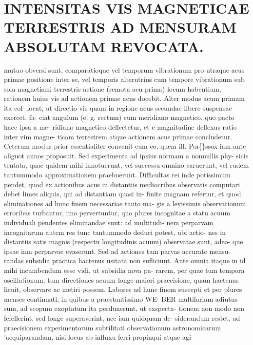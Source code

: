 \documentclass[12pt,a4paper]{article}
\begin{document}
\section*{INTENSITAS VIS MAGNETICAE TERRESTRIS AD MENSURAM ABSOLUTAM REVOCATA.}


mutuo obversi sunt, comparatioque vel temporum vibrationum pro utraque acus
primae positione inter se, vel temporis alterutrius cum tempore vibrationum sub
sola magnetismi terrestris actione (remota acu prima) locum habentium, rationem
huius vis ad actionem primae acus docebit. Alter modus acum primam ita col-
locat, ut directio vis quam in regione acus secundae libere suspensae exercet, fa-
ciat angulum (e. g. rectum) cum meridiano magnetico, quo pacto haec ipsa a me-
ridiano magnetico deflectetur, et e magnitudine deflexus ratio inter vim magne-
ticam terrestrem atque actionem acus primae concludetur.
Ceterum modus prior essentialiter convenit cum eo, quem ill. Po\i\{\}ssox iam
ante aliguot annos proposuit. Sed experimenta ad ipsius normam a nonnullis phy-
sicis tentata, quae quidem mihi innotuerunt,     vel successu omnino caruerunt,     vel
rudem tantummodo approximationem praebuerunt.
Difficultas rei inde potissimum pendet, quod ex actionibus acus in distantiis
mediocribus observatis computari debet limes aliquis, qui ad distantiam quasi in-
finite magnam refertur, et quod eliminationes ad hunc finem necessariae tanto ma-
gis a levissimis observationum erroribus turbantur, imo pervertuntur, quo plures
incognitae a statu acuum individuali pendentes eliminandae sunt: ad multitudi-
nem perparvam incognitarum autem res tunc tantummodo deduci potest, ubi actio-
nes in distantiis satis magnis (respectu longitudinis acuum) observatae sunt, adeo-
que ipsae iam perparvae evaserunt.      Sed ad actiones tam parvas accurate mensu-
randas subsidia practica hactenus usitata non sufliciunt.
Ante omnia itaque in id mihi incumbendum        esse vidi, ut subsidia nova pa-
rarem, per quae tum tempora oscillationum, tum directiones acuum longe maiori
praecisione, quam hactenus licuit, observare ac metiri possem.  Labores ad hunc
finem suscepti et per plures menses continuati, in quibus a praestantissimo WE-
BER multifariam adiutus sum, ad scopum exoptatum ita perduxerunt, ut exspecta-
tionem non modo non fefellerint, sed longe superaverint, nec iam quidquam de-
siderandum   restet,   ad praecisionem   experimentorum    subtilitati   observationum
astronomicarum 'aequiparandam,     nisi locus ab influxu ferri propinqui atque agi-
\end{document}
